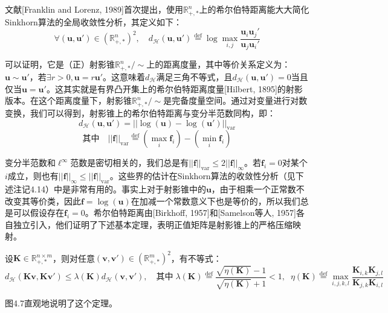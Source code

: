 \documentclass[cn,10pt,math=newtx,citestyle=gb7714-2015,bibstyle=gb7714-2015]{elegantbook}
\begin{document}
\begin{postulate}[希尔伯特距离]
文献[Franklin and Lorenz, 1989]首次提出，使用$\mathbb{R}_{+,*}^n$上的希尔伯特距离能大大简化Sinkhorn算法的全局收敛性分析，其定义如下：
\begin{equation*}
    \forall (\mathbf{u,u'})\in(\mathbb{R}_{+,*}^n)^2, \quad d_\mathcal{H}(\mathbf{u,u'})\overset{\text{def}}{=} \log \max\limits_{i,j} \frac{\mathbf{u}_i\mathbf{u}_j'}{\mathbf{u}_j\mathbf{u}_i'}
\end{equation*}

可以证明，它是（正）射影锥$\mathbb{R}_{+,*}^n/\sim$上的距离度量，其中等价关系定义为：$\mathbf{u}\sim \mathbf{u'}$，若$\exists r>0, \mathbf{u}=r\mathbf{u'}$。这意味着$d_\mathcal{H}$满足三角不等式，且$d_\mathcal{H}(\mathbf{u,u'})=0$当且仅当$\mathbf{u}=\mathbf{u'}$。这其实就是有界凸开集上的希尔伯特距离度量[Hilbert, 1895]的射影版本。在这个距离度量下，射影锥$\mathbb{R}_{+,*}^n/\sim$是完备度量空间。通过对变量进行对数变换，我们可以得到，射影锥上的希尔伯特距离与变分半范数同构，即：
\begin{equation}
    \label{4.21}
    d_\mathcal{H}(\mathbf{u,u'}) = ||\log(\mathbf{u})-\log(\mathbf{u'})||_{\text{var}}
\end{equation}
\begin{equation*}
    \text{其中} \quad ||\mathbf{f}||_{\text{var}}\overset{\text{def}}{=} (\max\limits_i \mathbf{f}_i) - (\min\limits_i \mathbf{f}_i)
\end{equation*}

变分半范数和$\ell^\infty$范数是密切相关的，我们总是有$||\mathbf{f}||_{\text{var}}\leq 2||\mathbf{f}||_\infty$。若$\mathbf{f}_i=0$对某个$i$成立，则也有$||\mathbf{f}||_\infty \leq ||\mathbf{f}||_{\text{var}}$。这些界的估计在Sinkhorn算法的收敛性分析（见下述注记4.14）中是非常有用的。事实上对于射影锥中的$\mathbf{u}$，由于相乘一个正常数不改变其等价类，因此$\mathbf{f}=\log(\mathbf{u})$在加减一个常数意义下也是等价的，所以我们总是可以假设存在$\mathbf{f}_i=0$。希尔伯特距离由[Birkhoff, 1957]和[Samelson等人, 1957]各自独立引入，他们证明了下述基本定理，表明正值矩阵是射影锥上的严格压缩映射。
\end{postulate}

\begin{theorem}
设$\mathbf{K}\in\mathbb{R}_{+,*}^{n\times m}$，则对任意$(\mathbf{v,v'})\in (\mathbb{R}_{+,*}^{m})^2$，有不等式：
\begin{equation*}
    d_\mathcal{H}(\mathbf{Kv,Kv'}) \leq \lambda(\mathbf{K})d_\mathcal{H}(\mathbf{v,v'}), \quad \text{其中} \;
         \lambda(\mathbf{K}) \overset{\text{def}}{=} \frac{\sqrt{\eta(\mathbf{K})}-1}{\sqrt{\eta(\mathbf{K})}+1} < 1, \;\;
         \eta(\mathbf{K}) \overset{\text{def}}{=} \max\limits_{i,j,k,l}\frac{\mathbf{K}_{i,k}\mathbf{K}_{j,l}}{\mathbf{K}_{j,k}\mathbf{K}_{i,l}}
\end{equation*}

图4.7直观地说明了这个定理。
\end{theorem}
\end{document}
